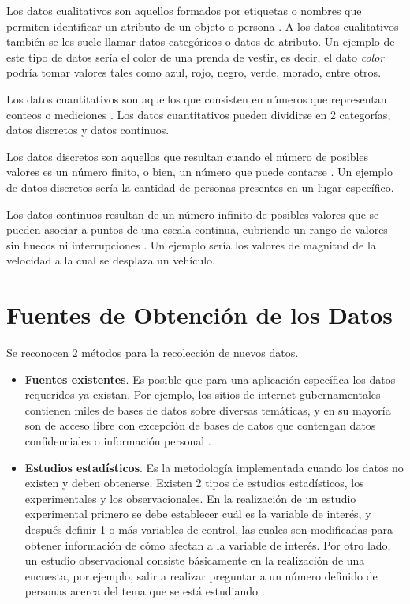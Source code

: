 Los datos cualitativos son aquellos formados por etiquetas o nombres que permiten identificar un atributo de un objeto o persona \cite{anderson}. A los datos cualitativos también se les suele llamar datos categóricos o datos 
de atributo. Un ejemplo de este tipo de datos sería el color de una prenda de vestir, es decir, el dato \textit{color} podría tomar valores tales como azul, rojo, negro, verde, morado, entre otros.

Los datos cuantitativos son aquellos que consisten en números que representan conteos o mediciones \cite{triola}. Los datos cuantitativos pueden dividirse en 2 categorías, datos discretos y datos continuos.

Los datos discretos son aquellos que resultan cuando el número de posibles valores es un número finito, o bien, un número que puede contarse \cite{triola}. Un ejemplo de datos discretos sería la cantidad de personas presentes 
en un lugar específico.

Los datos continuos resultan de un número infinito de posibles valores que se pueden asociar a puntos de una escala continua, cubriendo un rango de valores sin huecos ni interrupciones \cite{triola}. Un ejemplo sería los 
valores de magnitud de la velocidad a la cual se desplaza un vehículo.

\section{Fuentes de Obtención de los Datos}

Se reconocen 2 métodos para la recolección de nuevos datos.

\begin{itemize}
    \item \textbf{Fuentes existentes}. Es posible que para una aplicación específica los datos requeridos ya existan. Por ejemplo, los sitios de internet gubernamentales contienen miles de bases de datos sobre diversas temáticas,
	y en su mayoría son de acceso libre con excepción de bases de datos que contengan datos confidenciales o información personal \cite{anderson}. 
    \item \textbf{Estudios estadísticos}. Es la metodología implementada cuando los datos no existen y deben obtenerse. Existen 2 tipos de estudios estadísticos, los experimentales y los observacionales. En la realización de un 
    estudio experimental primero se debe establecer cuál es la variable de interés, y después definir 1 o más variables de control, las cuales son modificadas para obtener información de cómo afectan a la variable de interés.
	Por otro lado, un estudio observacional consiste básicamente en la realización de una encuesta, por ejemplo, salir a realizar preguntar a un número definido de personas acerca del tema que se está estudiando \cite{anderson}. 
\end{itemize}

